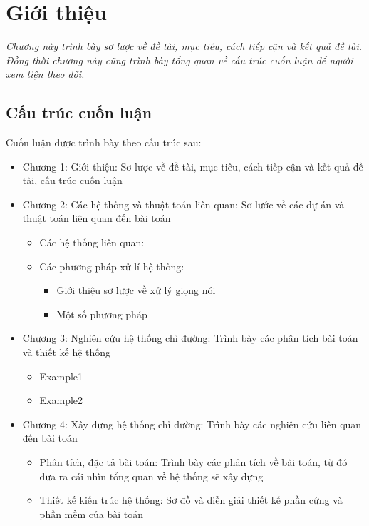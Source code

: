\chapter{Giới thiệu}
\label{Chapter1}

\emph{Chương này trình bày sơ lược về đề tài, mục tiêu, cách tiếp cận và kết quả đề tài. Đồng thời chương này cũng trình bày tổng quan về cấu trúc cuốn luận để người xem tiện theo dõi.}
\section{Cấu trúc cuốn luận}
Cuốn luận được trình bày theo cấu trúc sau:
\begin{itemize}
    \item Chương 1: Giới thiệu: Sơ lược về đề tài, mục tiêu, cách tiếp cận và kết quả đề tài, cấu trúc cuốn luận
    \item Chương 2: Các hệ thống và thuật toán liên quan: Sơ lước về các dự án và thuật toán liên quan đến bài toán
          \begin{itemize}
              \item Các hệ thống liên quan: 
              \item Các phương pháp xử lí hệ thống:
                    \begin{itemize}
                        \item Giới thiệu sơ lược về xử lý giọng nói
                        \item Một số phương pháp 
                    \end{itemize}
          \end{itemize}
    \item Chương 3: Nghiên cứu hệ thống chỉ đường: Trình bày các phân tích bài toán và thiết kế hệ thống
          \begin{itemize}
              \item Example1
              \item Example2
          \end{itemize}
    \item Chương 4: Xây dựng hệ thống chỉ đường: Trình bày các nghiên cứu liên quan đến bài toán
          \begin{itemize}
              \item Phân tích, đặc tả bài toán: Trình bày các phân tích về bài toán, từ đó đưa ra cái nhìn tổng quan về hệ thống sẽ xây dựng
              \item Thiết kế kiến trúc hệ thống: Sơ đồ và diễn giải thiết kế phần cứng và phần mềm của bài toán

\end{itemize}
\end{itemize}

